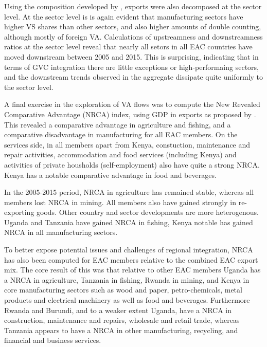 \documentclass[a4paper]{article}
\begin{document}
 Using the composition developed by \citet{wang2013quantifying}, exports were also decomposed at the sector level. At the sector level is is again evident that manufacturing sectors have higher VS shares than other sectors, and also higher amounts of double counting, although mostly of foreign VA. Calculations of upstreamness and downstreamness ratios at the sector level reveal that nearly all setors in all EAC countries have moved downstream between 2005 and 2015. This is surprising, indicating that in terms of GVC integration there are little exceptions or high-performaing sectors, and the downstream trends observed in the aggregate dissipate quite uniformly to the sector level. \newline 

A final exercise in the exploration of VA flows was to compute the New Revealed Comparative Advantage (NRCA) index,  using GDP in exports as proposed by \citet{koopman2014tracing}. This revealed a comparative advantage in agriculture and fishing, and a comparative disadvantage in manufacturing for all EAC members. On the services side, in all members apart from Kenya, constuction, maintenance and repair activities, accommodation and food services (including Kenya) and activities of private housholds (self-employment) also have quite a strong NRCA. Kenya has a notable comparative advantage in food and beverages. \newline

In the 2005-2015 period, NRCA in agriculture has remained stable, whereas all members lost NRCA in mining. All members also have gained strongly in re-exporting goods.  Other country and sector developments are more heterogenous. Uganda and Tanzania have gained NRCA in fishing, Kenya notable has gained NRCA in all manufacturing sectors. \newline

To better expose potential issues and challenges of regional integration, NRCA has also been computed for EAC members relative to the combined EAC export mix. The core result of this was that relative to other EAC members Uganda has a NRCA in agriculture, Tanzania in fishing, Rwanda in mining, and Kenya in core manufacturing sectors such as wood and paper, petro-chemicals, metal products and electrical machinery as well as food and beverages. Furthermore Rwanda and Burundi, and to a weaker extent Uganda, have a NRCA in construction, maintenance and repairs, wholesale and retail trade, whereas Tanzania appears to have a NRCA in other manufacturing, recycling, and financial and business services.
\end{document}
